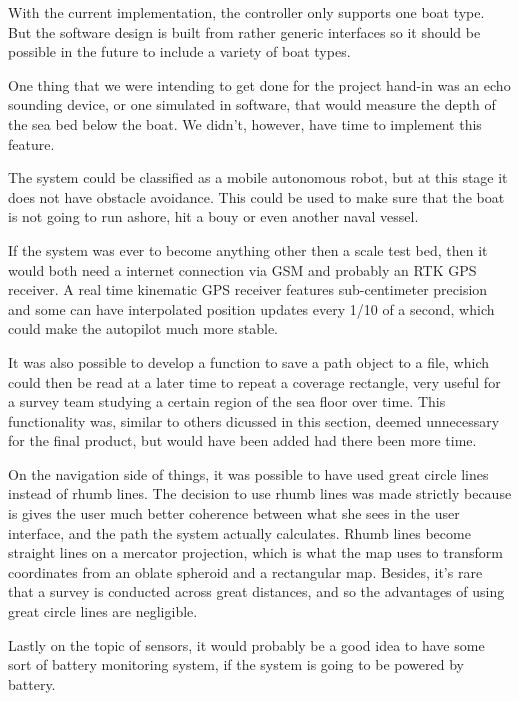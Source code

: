 With the current implementation, the controller only supports one boat type. But the software design is built from rather generic interfaces so it should be possible in the future to include a variety of boat types.

One thing that we were intending to get done for the project hand-in was an echo sounding device, or one simulated in software, that would measure the depth of the sea bed below the boat. We didn't, however, have time to implement this feature.

The system could be classified as a mobile autonomous robot, but at this stage it does not have obstacle avoidance. This could be used to make sure that the boat is not going to run ashore, hit a bouy or even another naval vessel. 

If the system was ever to become anything other then a scale test bed, then it would both need a internet connection via GSM and probably an RTK GPS receiver. A real time kinematic GPS receiver features sub-centimeter precision and some can have interpolated position updates every 1/10 of a second, which could make the autopilot much more stable.

It was also possible to develop a function to save a path object to a file, which could then be read at a later time to repeat a coverage rectangle, very useful for a survey team studying a certain region of the sea floor over time. This functionality was, similar to others dicussed in this section, deemed unnecessary for the final product, but would have been added had there been more time.

On the navigation side of things, it was possible to have used great circle lines instead of rhumb lines. The decision to use rhumb lines was made strictly because is gives the user much better coherence between what she sees in the user interface, and the path the system actually calculates. Rhumb lines become straight lines on a mercator projection, which is what the map uses to transform coordinates from an oblate spheroid and a rectangular map. Besides, it's rare that a survey is conducted across great distances, and so the advantages of using great circle lines are negligible.

Lastly on the topic of sensors, it would probably be a good idea to have some sort of battery monitoring system, if the system is going to be powered by battery. 

